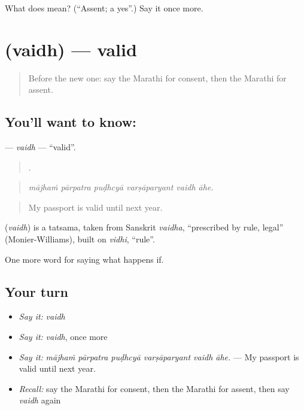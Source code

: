 \begin{tcolorbox}[breakable,colback=teal!4,colframe=teal!35!black,title={Before you move on}]
What does  mean? (\textquotedblleft{}Assent; a yes\textquotedblright{}.) Say it once more.
\end{tcolorbox}
\section[\texorpdfstring{\mr{वैध} (vaidh)}{वैध (vaidh)}]{ (vaidh) — valid}

\label{lesson:MR-C543-vaidh}



\begin{quote}
Before the new one: say the Marathi for consent, then the Marathi for assent.
\end{quote}

\subsection*{You'll want to know: }
\textbf{} — \emph{vaidh} — \textquotedblleft{}valid\textquotedblright{}.

\begin{quote}
     .
\end{quote}

\begin{quote}
\emph{mājhaṁ pārpatra puḍhcyā varṣāparyant vaidh āhe.}
\end{quote}

\begin{quote}
My passport is valid until next year.
\end{quote}

\begin{cousinweb}
\textbf{} (\emph{vaidh}) is a tatsama, taken from Sanskrit \emph{vaidha}, \textquotedblleft{}prescribed by rule, legal\textquotedblright{} (Monier-Williams), built on \emph{vidhi}, \textquotedblleft{}rule\textquotedblright{}.
\end{cousinweb}

\begin{grammarlens}[title={What you've built}]
One more word for saying what happens if.
\end{grammarlens}

\subsection*{Your turn}
\begin{itemize}
\raggedright
  \item \emph{Say it:} \emph{vaidh}
  \item \emph{Say it:} \emph{vaidh}, once more
  \item \emph{Say it:} \emph{mājhaṁ pārpatra puḍhcyā varṣāparyant vaidh āhe.} — My passport is valid until next year.
  \item \emph{Recall:} say the Marathi for consent, then the Marathi for assent, then say \emph{vaidh} again
\end{itemize}

